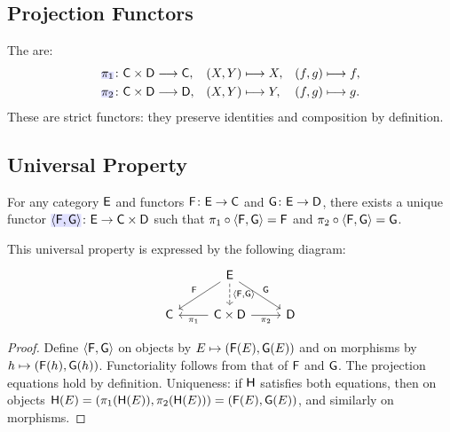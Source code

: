 \documentclass[../preamble]{subfiles}
\begin{document}
\subsection{Projection Functors}

\begin{definition}
  \label{def:projection-functors}
  The  are:
  \begin{align}
    \newmath{\Functor{\pi}_1} &\colon \Category{C} \times \Category{D} \lto \Category{C},
      &(X, Y) &\lmapsto X,
      &(f, g) &\lmapsto f, \label{eq:pi1} \\
    \newmath{\Functor{\pi}_2} &\colon \Category{C} \times \Category{D} \lto \Category{D},
      &(X, Y) &\lmapsto Y,
      &(f, g) &\lmapsto g. \label{eq:pi2}
  \end{align}
  These are strict functors:
  they preserve identities and composition by definition.
\end{definition}

\subsection{Universal Property}

\begin{proposition}
  \label{prop:product-universal}
  For any category $\mathsf{E}$
  and functors $\Functor{F} \colon \Category{E} \lto \Category{C}$
  and $\Functor{G} \colon \Category{E} \lto \Category{D}$,
  there exists a unique functor
  $\newmath{\langle \Functor{F}, \Functor{G} \rangle}
    \colon \Category{E} \lto \Category{C} \times \Category{D}$
  such that
  $\mathsf{\pi}_1 \circ \langle \mathsf{F}, \mathsf{G} \rangle = \mathsf{F}$
  and
  $\mathsf{\pi}_2 \circ \langle \mathsf{F}, \mathsf{G} \rangle = \mathsf{G}$.
\end{proposition}

This universal property is expressed by the following diagram:
\begin{equation}
  \label{eq:product-universal-diagram}
  \begin{tikzcd}
    & \Category{E}
      \arrow[dl, "\Functor{F}"']
      \arrow[dr, "\Functor{G}"]
      \arrow[d, dashed, "{\langle \Functor{F}{,} \Functor{G} \rangle}"] \\
    \Category{C}
    & \Category{C} \times \Category{D}
      \arrow[l, "\Functor{\pi}_1"]
      \arrow[r, "\Functor{\pi}_2"']
    & \Category{D}
  \end{tikzcd}
\end{equation}

\begin{proof}
  Define $\langle \mathsf{F}, \mathsf{G} \rangle$ on objects by
  $E \lmapsto (\Functor{F}(E), \Functor{G}(E))$
  and on morphisms by
  $h \lmapsto (\Functor{F}(h), \Functor{G}(h))$.
  Functoriality follows from that of $\mathsf{F}$ and $\mathsf{G}$.
  The projection equations hold by definition.
  Uniqueness: if $\mathsf{H}$ satisfies both equations,
  then on objects $\mathsf{H}(E)
    = (\mathsf{\pi}_1(\mathsf{H}(E)), \mathsf{\pi}_2(\mathsf{H}(E)))
    = (\mathsf{F}(E), \mathsf{G}(E))$,
  and similarly on morphisms.
\end{proof}
\end{document}
